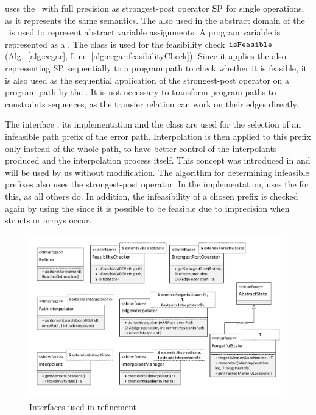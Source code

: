  uses the \ with full precision as strongest-post operator $\text{SP}$ for single operations, as it represents the same semantics. The  also used in the abstract domain of the \ is used to represent abstract variable assignments. A program variable is represented as a .
The class  is used for the feasibility check $\texttt{isFeasible}$ (Alg.~\ref{alg:cegar}, Line~\ref{alg:cegar:feasibilityCheck}).
Since it applies the  also representing $\text{SP}$ sequentially to a program path to check whether it is feasible, it is also used as the sequential application of the strongest-post operator on a program path by the  .
It is not necessary to transform program paths to constraints sequences, as the transfer relation can work on their edges directly.

The interface , its implementation  and the class 
are used for the selection of an infeasible path prefix of the error path.
Interpolation is then applied to this prefix only instead of the whole path, to have better control of the interpolants produced and the interpolation process itself.
This concept was introduced in \cite{Beyer2015} and will be used by us without modification.
The algorithm for determining infeasible prefixes also uses the strongest-post operator. In the implementation,
 uses the  for this, as all others do.
In addition, the infeasibility of a chosen prefix is checked again by using the  since it is possible to be feasible due to imprecision when structs or arrays occur.

\begin{figure}
\includegraphics[width=1.2\linewidth]{implementationCegar/RefinementInterfaces}
\caption{Interfaces used in refinement}
\label{fig:refInterfaces}
\end{figure}

